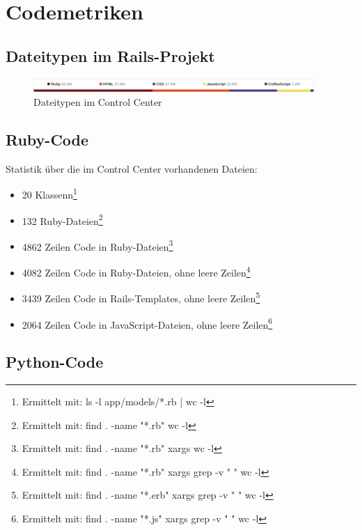 \chapter{Codemetriken} \label{appendix:code-metrics}

\section*{Dateitypen im Rails-Projekt}

\begin{figure}
  \centering
    \includegraphics[width=0.95\textwidth]{fig/github_filetypes}
  \caption{Dateitypen im Control Center}
  \label{fig:metrics-filetypes}
\end{figure}

\section*{Ruby-Code}

Statistik über die im Control Center vorhandenen Dateien:

\begin{itemize}
\item 20 Klassenn\footnote{Ermittelt mit: ls -l app/models/*.rb | wc -l}
\item 132 Ruby-Dateien\footnote{Ermittelt mit: find . -name "*.rb" \textbar wc -l}
\item 4862 Zeilen Code in Ruby-Dateien\footnote{Ermittelt mit: find . -name "*.rb" \textbar xargs wc -l}
\item 4082 Zeilen Code in Ruby-Dateien, ohne leere Zeilen\footnote{Ermittelt mit: find . -name "*.rb" \textbar xargs grep -v "  " \textbar wc -l}
\item 3439 Zeilen Code in Rails-Templates, ohne leere Zeilen\footnote{Ermittelt mit: find . -name "*.erb" \textbar xargs grep -v "  " \textbar wc -l}
\item 2064 Zeilen Code in JavaScript-Dateien, ohne leere Zeilen\footnote{Ermittelt mit: find . -name "*.js" \textbar xargs grep -v "  " \textbar wc -l}
\end{itemize}

\section*{Python-Code}

